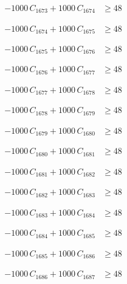 \documentclass[a4paper,11pt]{article}
\begin{document}
\begin{align}
-1000\,C_{1673} + 1000\,C_{1674} &\geq 48 \nonumber
\end{align}

\begin{align}
-1000\,C_{1674} + 1000\,C_{1675} &\geq 48 \nonumber
\end{align}

\begin{align}
-1000\,C_{1675} + 1000\,C_{1676} &\geq 48 \nonumber
\end{align}

\begin{align}
-1000\,C_{1676} + 1000\,C_{1677} &\geq 48 \nonumber
\end{align}

\begin{align}
-1000\,C_{1677} + 1000\,C_{1678} &\geq 48 \nonumber
\end{align}

\begin{align}
-1000\,C_{1678} + 1000\,C_{1679} &\geq 48 \nonumber
\end{align}

\begin{align}
-1000\,C_{1679} + 1000\,C_{1680} &\geq 48 \nonumber
\end{align}

\begin{align}
-1000\,C_{1680} + 1000\,C_{1681} &\geq 48 \nonumber
\end{align}

\begin{align}
-1000\,C_{1681} + 1000\,C_{1682} &\geq 48 \nonumber
\end{align}

\begin{align}
-1000\,C_{1682} + 1000\,C_{1683} &\geq 48 \nonumber
\end{align}

\begin{align}
-1000\,C_{1683} + 1000\,C_{1684} &\geq 48 \nonumber
\end{align}

\begin{align}
-1000\,C_{1684} + 1000\,C_{1685} &\geq 48 \nonumber
\end{align}

\begin{align}
-1000\,C_{1685} + 1000\,C_{1686} &\geq 48 \nonumber
\end{align}

\begin{align}
-1000\,C_{1686} + 1000\,C_{1687} &\geq 48 \nonumber
\end{align}
\end{document}
